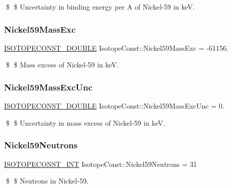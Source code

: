 \$ \$ Uncertainty in binding energy per A of Nickel-\/59 in keV. \mbox{\label{group___isotope_const-_nickel-_ni59_gacb7b4faa302c3adc7ad8dcfc670c4c80}} 
\subsubsection{\texorpdfstring{Nickel59\+Mass\+Exc}{Nickel59MassExc}}
{\footnotesize\ttfamily \mbox{\hyperlink{group___isotope_const-_macros_ga8f45a7272ce02c0b4c65c44636ed719a}{I\+S\+O\+T\+O\+P\+E\+C\+O\+N\+S\+T\+\_\+\+D\+O\+U\+B\+LE}} Isotope\+Const\+::\+Nickel59\+Mass\+Exc = -\/61156.}

\$ \$ Mass excess of Nickel-\/59 in keV. \mbox{\label{group___isotope_const-_nickel-_ni59_ga8f1f6db53e290ffce4b72a4e1317e14c}} 
\subsubsection{\texorpdfstring{Nickel59\+Mass\+Exc\+Unc}{Nickel59MassExcUnc}}
{\footnotesize\ttfamily \mbox{\hyperlink{group___isotope_const-_macros_ga8f45a7272ce02c0b4c65c44636ed719a}{I\+S\+O\+T\+O\+P\+E\+C\+O\+N\+S\+T\+\_\+\+D\+O\+U\+B\+LE}} Isotope\+Const\+::\+Nickel59\+Mass\+Exc\+Unc = 0.}

\$ \$ Uncertainty in mass excess of Nickel-\/59 in keV. \mbox{\label{group___isotope_const-_nickel-_ni59_ga008e3f7cccdd9f53f6674405635b8083}} 
\subsubsection{\texorpdfstring{Nickel59\+Neutrons}{Nickel59Neutrons}}
{\footnotesize\ttfamily \mbox{\hyperlink{group___isotope_const-_macros_ga5f18360b3e99483a35c32d789e62621c}{I\+S\+O\+T\+O\+P\+E\+C\+O\+N\+S\+T\+\_\+\+I\+NT}} Isotope\+Const\+::\+Nickel59\+Neutrons = 31}

\$ \$ Neutrons in Nickel-\/59. \mbox{\label{group___isotope_const-_nickel-_ni59_gad15816b38057118835d6504b3308edea}} 
